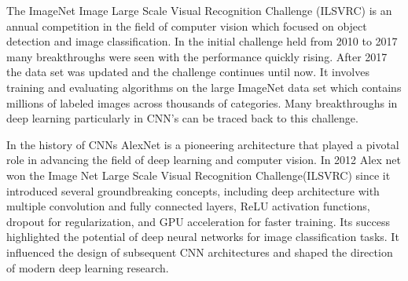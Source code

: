 \documentclass[
a4paper, 
12pt,
grayscalebody, %
abstract=on,
twoside, BCOR10mm, 12pt, DIV13,headinclude, footexclude, final, abstracton, openright
]{ibireprt}
\numberwithin{equation}{chapter}
\numberwithin{table}{chapter}
\numberwithin{figure}{chapter}
\numberwithin{algorithm}{chapter}
\numberwithin{example}{chapter}
\numberwithin{example}{chapter}
\begin{document}
The ImageNet Image Large Scale Visual Recognition Challenge (ILSVRC) is an annual competition in the field of computer vision which focused on object detection and image classification. In the initial challenge held from 2010 to 2017 many breakthroughs were seen with the performance quickly rising. After 2017 the data set was updated and the challenge continues until now. It involves training and evaluating algorithms on the large ImageNet data set which contains millions of labeled images across thousands of categories. Many breakthroughs in deep learning particularly in CNN's can be traced back to this challenge.

In the history of CNNs AlexNet is a pioneering architecture that played a pivotal role in advancing the field of deep learning and computer vision. \cite{Alzubaidi2021} In 2012 Alex net won the Image Net Large Scale Visual Recognition Challenge(ILSVRC) since it introduced several groundbreaking concepts, including deep architecture with multiple convolution and fully connected layers, ReLU activation functions, dropout for regularization, and GPU acceleration for faster training. Its success highlighted the potential of deep neural networks for image classification tasks. It influenced the design of subsequent CNN architectures and shaped the direction of modern deep learning research.
\end{document}
